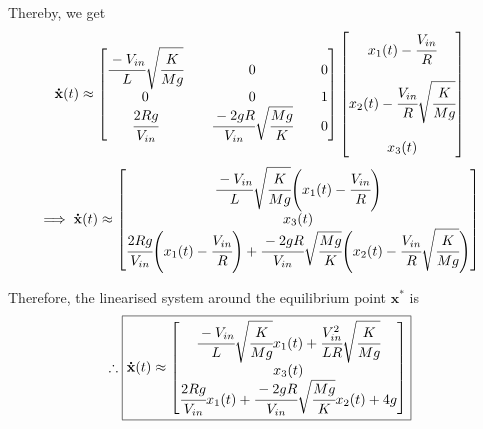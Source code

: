 Thereby, we get
\[
    \mathbf{\dot x}(t) \approx
    \begin{bmatrix}
        \cfrac{-V_{in}}{L} \sqrt{\cfrac{K}{Mg}} &  & 0                                        &  & 0 \\
        0                                       &  & 0                                        &  & 1 \\
        \cfrac{2 R g}{V_{in}}                   &  & \cfrac{-2gR}{V_{in}}\sqrt{\cfrac{Mg}{K}} &  & 0
    \end{bmatrix}
    \begin{bmatrix}
        x_1(t) - \cfrac{V_{in}}{R}                      \\
        \\
        x_2(t) - \cfrac{V_{in}}{R} \sqrt{\cfrac{K}{Mg}} \\
        \\
        x_3(t)
    \end{bmatrix}
\]
\[
    \implies
    \mathbf{\dot x}(t) \approx
    \begin{bmatrix}
        \cfrac{-V_{in}}{L} \sqrt{\cfrac{K}{Mg}} \Bigg( x_1(t) - \cfrac{V_{in}}{R} \Bigg) \\
        x_3(t)                                                                           \\
        \cfrac{2 R g}{V_{in}} \Bigg( x_1(t) - \cfrac{V_{in}}{R} \Bigg) + \cfrac{-2gR}{V_{in}}\sqrt{\cfrac{Mg}{K}} \Bigg( x_2(t) - \cfrac{V_{in}}{R} \sqrt{\cfrac{K}{Mg}} \Bigg)
    \end{bmatrix}
\]

Therefore, the linearised system around the equilibrium point \( \mathbf{x^*} \) is
\[
    \therefore
    \boxed{
        \mathbf{\dot x}(t) \approx
        \begin{bmatrix}
            \cfrac{-V_{in}}{L} \sqrt{\cfrac{K}{Mg}} x_1(t) + \cfrac{V_{in}^2}{LR} \sqrt{\cfrac{K}{Mg}} \\
            x_3(t)                                                                                     \\
            \cfrac{2 R g}{V_{in}} x_1(t) + \cfrac{-2gR}{V_{in}} \sqrt{\cfrac{Mg}{K}} x_2(t) + 4g
        \end{bmatrix}
    }
\]
